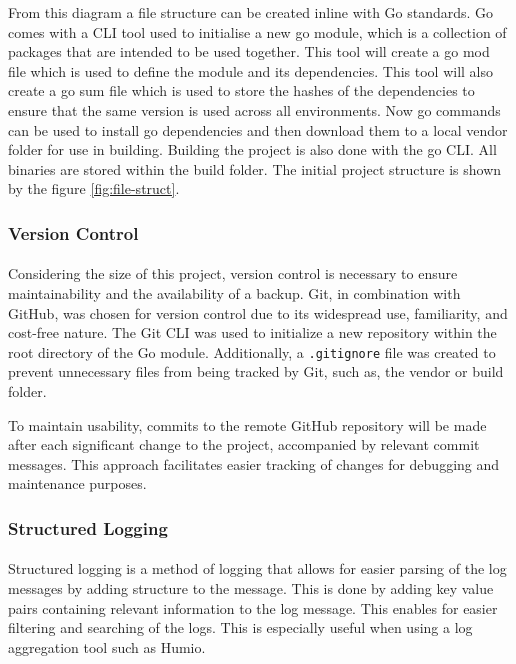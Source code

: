 \documentclass[12pt, conference, final, a4paper, onecolumn, compsoc]{IEEEtran}
\begin{document}
From this diagram a file structure can be created inline with Go standards. Go
comes with a CLI tool used to initialise a new go module, which is a collection
of packages that are intended to be used together. This tool will create a go
mod file which is used to define the module and its dependencies. This tool will
also create a go sum file which is used to store the hashes of the dependencies
to ensure that the same version is used across all environments. Now go commands
can be used to install go dependencies and then download them to a local vendor
folder for use in building. Building the project is also done with the go CLI.
All binaries are stored within the build folder. The initial project structure
is shown by the figure \ref{fig:file-struct}.

\subsubsection*{Version Control}
\paragraph{}

Considering the size of this project, version control is necessary to ensure
maintainability and the availability of a backup. Git, in combination with
GitHub, was chosen for version control due to its widespread use, familiarity,
and cost-free nature. The Git CLI was used to initialize a new repository within
the root directory of the Go module. Additionally, a \texttt{.gitignore} file
was created to prevent unnecessary files from being tracked by Git, such as, the
vendor or build folder.

To maintain usability, commits to the remote GitHub repository will be made
after each significant change to the project, accompanied by relevant commit
messages. This approach facilitates easier tracking of changes for debugging and
maintenance purposes.

\subsubsection*{Structured Logging}
\paragraph{}

Structured logging is a method of logging that allows for easier parsing of the
log messages by adding structure to the message. This is done by adding key
value pairs containing relevant information to the log message. This enables for
easier filtering and searching of the logs. This is especially useful when using
a log aggregation tool such as Humio.
\end{document}
